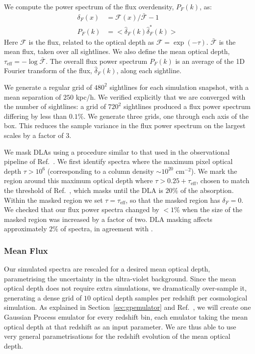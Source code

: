 \documentclass[a4paper,11pt]{article}
\begin{document}
We compute the power spectrum of the flux overdensity, $P_F(k)$, as:
\begin{align}
 \delta_F(x) &= \mathcal{F}(x) / \bar{\mathcal{F}} - 1 \\
 P_F(k) &= < \hat{\delta}_F(k) \hat{\delta}_F^*(k) >
\end{align}
Here $\mathcal{F}$ is the flux, related to the optical depth as $\mathcal{F} = \exp{(-\tau)}$. $\bar{\mathcal{F}}$ is the mean flux, taken over all sightlines. We also define the mean optical depth, $\tau_\mathrm{eff} = -\log \bar{\mathcal{F}}$. The overall flux power spectrum $P_F(k) $ is an average of the 1D Fourier transform of the flux, $\hat{\delta}_F(k)$, along each sightline.

We generate a regular grid of $480^2$ sightlines for each simulation snapshot, with a mean separation of $250$ kpc/h. We verified explicitly that we are converged with the number of sightlines: a grid of $720^2$ sightlines produced a flux power spectrum differing by less than $0.1\%$. We generate three grids, one through each axis of the box. This reduces the sample variance in the flux power spectrum on the largest scales by a factor of $3$.

We mask DLAs using a procedure similar to that used in the observational pipeline of Ref.~\cite{Chabanier:2020}. We first identify spectra where the maximum pixel optical depth $\tau > 10^6$ (corresponding to a column density $\sim 10^{20}$ cm$^{-2}$). We mark the region around this maximum optical depth where $\tau > 0.25 + \tau_\mathrm{eff}$, chosen to match the threshold of Ref.~\cite{Chabanier:2020}, which masks until the DLA is $20\%$ of the absorption. Within the masked region we set $\tau = \tau_\mathrm{eff}$, so that the masked region has $\delta_F = 0$. We checked that our flux power spectra changed by $< 1\%$ when the size of the masked region was increased by a factor of two. DLA masking affects approximately $2\%$ of spectra, in agreement with \cite{Rogers:2019}.

\subsubsection{Mean Flux}

Our simulated spectra are rescaled for a desired mean optical depth, parametrising the uncertainty in the ultra-violet background.
Since the mean optical depth does not require extra simulations, we dramatically over-sample it, generating a dense grid of $10$ optical depth samples per redshift per cosmological simulation. As explained in Section~\ref{sec:gpemulator} and Ref.~\cite{Bird:2019}, we will create one Gaussian Process emulator for every redshift bin, each emulator taking the mean optical depth at that redshift as an input parameter. We are thus able to use very general parametrisations for the redshift evolution of the mean optical depth.
\end{document}
